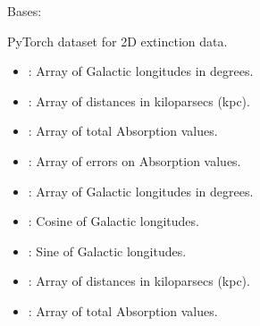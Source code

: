 \documentclass[letterpaper,10pt,english]{sphinxmanual}
\begin{document}
\begin{fulllineitems}
\label{\detokenize{Dataset2D:Dataset2D.Dataset2D}}
\pysigstartsignatures
{}
\pysigstopsignatures
\sphinxAtStartPar
Bases: 

\sphinxAtStartPar
PyTorch dataset for 2D extinction data.
\begin{description}
\begin{itemize}
\item {} 
\sphinxAtStartPar
{}: Array of Galactic longitudes in degrees.

\item {} 
\sphinxAtStartPar
{}: Array of distances in kiloparsecs (kpc).

\item {} 
\sphinxAtStartPar
{}: Array of total Absorption values.

\item {} 
\sphinxAtStartPar
{}: Array of errors on Absorption values.

\end{itemize}

\begin{itemize}
\item {} 
\sphinxAtStartPar
{}: Array of Galactic longitudes in degrees.

\item {} 
\sphinxAtStartPar
{}: Cosine of Galactic longitudes.

\item {} 
\sphinxAtStartPar
{}: Sine of Galactic longitudes.

\item {} 
\sphinxAtStartPar
{}: Array of distances in kiloparsecs (kpc).

\item {} 
\sphinxAtStartPar
{}: Array of total Absorption values.


\end{itemize}
\end{description}
\end{fulllineitems}
\end{document}
